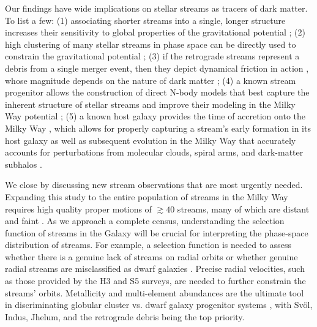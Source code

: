 \documentclass[twocolumn]{aastex63}
\begin{document}
Our findings have wide implications on stellar streams as tracers of dark matter.
To list a few:
(1) associating shorter streams into a single, longer structure increases their sensitivity to global properties of the gravitational potential \citep{bh2018};
(2) high clustering of many stellar streams in phase space can be directly used to constrain the gravitational potential \citep{sanderson2015, reino2020};
(3) if the retrograde streams represent a debris from a single merger event, then they depict dynamical friction in action \citep[e.g.,][]{chandrasekhar1942, white1978}, whose magnitude depends on the nature of dark matter \citep[e.g.,][]{lancaster2020};
(4) a known stream progenitor allows the construction of direct N-body models that best capture the inherent structure of stellar streams \citep[e.g.,][]{kuepper2008, just2009} and improve their modeling in the Milky Way potential \citep{kuepper2015};
(5) a known host galaxy provides the time of accretion onto the Milky Way \citep[e.g.,][]{kruijssen2020}, which allows for properly capturing a stream's early formation in its host galaxy \citep[e.g.,][]{carlberg2018, malhan2020} as well as subsequent evolution in the Milky Way that accurately accounts for perturbations from molecular clouds, spiral arms, and dark-matter subhalos \citep[e.g.,][]{erkal2016, banik2019}.

We close by discussing new stream observations that are most urgently needed.
Expanding this study to the entire population of streams in the Milky Way requires high quality proper motions of $\gtrsim40$ streams, many of which are distant and faint \citep[e.g.,][]{grillmair2009, grillmair2017}.
As we approach a complete census, understanding the selection function of streams in the Galaxy will be crucial for interpreting the phase-space distribution of streams.
For example, a selection function is needed to assess whether there is a genuine lack of streams on radial orbits \citep[as shell rather than stream morphologies are expected on such orbits,][]{hendel2015} or whether genuine radial streams are misclassified as dwarf galaxies \citep[that have anomalously large velocity dispersions and/or distance gradients,][]{kuepper2017}.
Precise radial velocities, such as those provided by the H3 \citep{conroy2019} and S5 \citep{li2019} surveys, are needed to further constrain the streams' orbits.
Metallicity and multi-element abundances are the ultimate tool in discriminating globular cluster vs. dwarf galaxy progenitor systems \citep[e.g.,][]{hansen2020}, with Sv\" ol, Indus, Jhelum, and the retrograde debris being the top priority.
\end{document}
